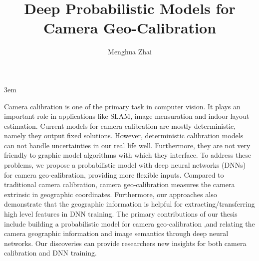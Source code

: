 \documentclass[final]{ukthesis}
\begin{document}
\emergencystretch 3em

\author{Menghua Zhai}
\title{Deep Probabilistic Models for Camera Geo-Calibration}

\abstract
{ \SingleSpacing
Camera calibration is one of the primary task in computer vision.
It plays an important role in applications like SLAM, image
mensuration and indoor layout estimation. Current models for camera
calibration are mostly deterministic, namely they output fixed
solutions. 
However, deterministic calibration models can not handle uncertainties
in our real life well. Furthermore, they are not very friendly to
graphic model algorithms with which they interface.
To address these problems, we propose a probabilistic model with deep
neural networks (DNNs) for camera geo-calibration, providing more
flexible inputs. Compared to traditional camera calibration,
camera geo-calibration measures the camera extrinsic in geographic
coordinates.  Furthermore, our approaches also demonstrate that the
geographic information is helpful for extracting/transferring high
level features in DNN training.  The primary contributions of our
thesis include building a probabilistic model for camera
geo-calibration ,and relating the camera geographic information and
image semantics through deep neural networks. Our discoveries can
provide researchers new insights for both camera calibration and DNN
training.
}


\frontmatter
\maketitle



\tableofcontents\clearpage

\mainmatter




\backmatter




\end{document}
